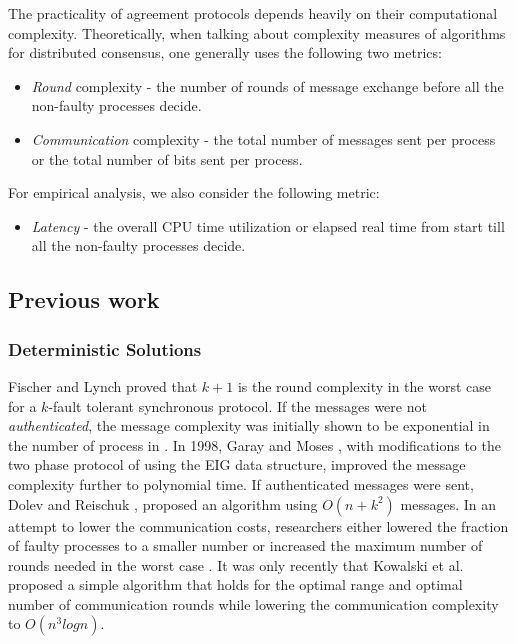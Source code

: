 The practicality of agreement protocols depends heavily on their computational complexity. Theoretically, when talking about complexity measures of algorithms for distributed consensus, one generally uses the following two metrics:
\begin{itemize}
\item \textit{Round} complexity - the number of rounds of message exchange before all the non-faulty processes decide.
\item \textit{Communication} complexity - the total number of messages sent per process or the total number of bits sent per process.
\end{itemize}
For empirical analysis, we also consider the following metric: 
\begin{itemize}
\item \textit{Latency} - the overall CPU time utilization or elapsed real time from start till all the non-faulty processes decide.
\end{itemize}

\subsection{Previous work}

\subsubsection{Deterministic Solutions}
Fischer and Lynch \cite{Fischer81alower} proved that $k + 1$ is the round complexity in the worst case for a $k$-fault tolerant synchronous protocol. If the messages were not \textit{authenticated}, the message complexity was initially shown to be exponential in the number of process in \cite{PeaseSL80}. In 1998, Garay and Moses \cite{GarayM98}, with modifications to the two phase protocol of \cite{BDDS87} using the EIG data structure, improved the message complexity further to polynomial time. If authenticated messages were sent, Dolev and Reischuk \cite{DolevR85}, proposed an algorithm using $O(n + k^2)$ messages. In an attempt to lower the communication costs, researchers either lowered the fraction of faulty processes to a smaller number \cite{DRS90} or increased the maximum number of rounds needed in the worst case \cite{TPS87}. It was only recently that Kowalski et al. \cite{KM13} proposed a simple algorithm that holds for the optimal range and optimal number of communication rounds while lowering the communication complexity to $O(n^{3}logn)$.

